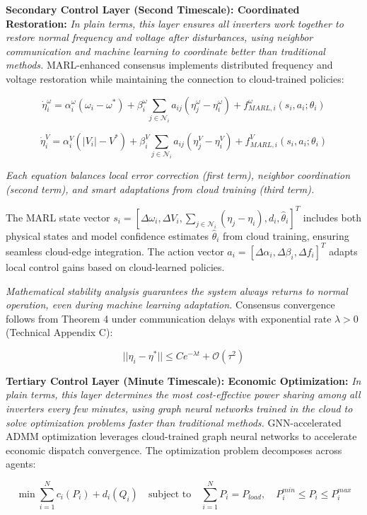 \documentclass[12pt]{article}
\begin{document}
\textbf{Secondary Control Layer (Second Timescale): Coordinated Restoration:} \textit{In plain terms, this layer ensures all inverters work together to restore normal frequency and voltage after disturbances, using neighbor communication and machine learning to coordinate better than traditional methods.} MARL-enhanced consensus implements distributed frequency and voltage restoration while maintaining the connection to cloud-trained policies:

$$\dot{\eta}_i^{\omega} = \alpha_i^{\omega}(\omega_i - \omega^*) + \beta_i^{\omega} \sum_{j \in \mathcal{N}_i} a_{ij}(\eta_j^{\omega} - \eta_i^{\omega}) + f_{MARL,i}^{\omega}(s_i, a_i; \theta_i)$$

$$\dot{\eta}_i^{V} = \alpha_i^{V}(|V_i| - V^*) + \beta_i^{V} \sum_{j \in \mathcal{N}_i} a_{ij}(\eta_j^{V} - \eta_i^{V}) + f_{MARL,i}^{V}(s_i, a_i; \theta_i)$$

\textit{Each equation balances local error correction (first term), neighbor coordination (second term), and smart adaptations from cloud training (third term).}

The MARL state vector $s_i = [\Delta\omega_i, \Delta V_i, \sum_{j \in \mathcal{N}_i}(\eta_j - \eta_i), d_i, \hat{\theta}_i]^T$ includes both physical states and model confidence estimates $\hat{\theta}_i$ from cloud training, ensuring seamless cloud-edge integration. The action vector $a_i = [\Delta\alpha_i, \Delta\beta_i, \Delta f_i]^T$ adapts local control gains based on cloud-learned policies.

\textit{Mathematical stability analysis guarantees the system always returns to normal operation, even during machine learning adaptation.} Consensus convergence follows from Theorem 4 under communication delays with exponential rate $\lambda > 0$ (Technical Appendix C):

$$||\eta_i - \eta^*|| \leq Ce^{-\lambda t} + \mathcal{O}(\tau^2)$$

\textbf{Tertiary Control Layer (Minute Timescale): Economic Optimization:} \textit{In plain terms, this layer determines the most cost-effective power sharing among all inverters every few minutes, using graph neural networks trained in the cloud to solve optimization problems faster than traditional methods.} GNN-accelerated ADMM optimization leverages cloud-trained graph neural networks to accelerate economic dispatch convergence. The optimization problem decomposes across agents:

$$\min \sum_{i=1}^N c_i(P_i) + d_i(Q_i) \quad \text{subject to} \quad \sum_{i=1}^N P_i = P_{load}, \quad P_i^{min} \leq P_i \leq P_i^{max}$$
\end{document}
